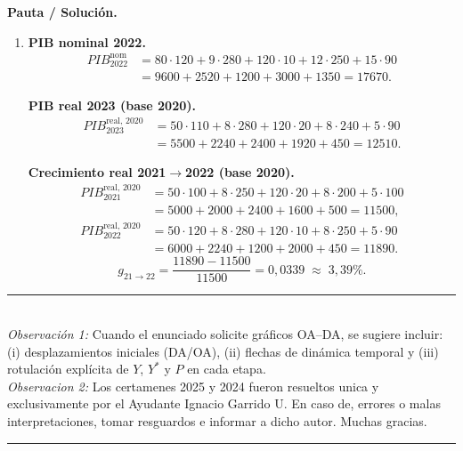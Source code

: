 \documentclass[11pt,addpoints]{article}
\begin{document}
\textbf{Pauta / Solución.}
\begin{enumerate}[label=\alph*)]
\item \textbf{PIB nominal 2022.}
\[
\begin{aligned}
PIB_{2022}^{\text{nom}} &= 80\cdot120 + 9\cdot280 + 120\cdot 10 + 12\cdot 250 + 15\cdot 90 \\
&= 9600 + 2520 + 1200 + 3000 + 1350 = \boxed{17670}.
\end{aligned}
\]

\textbf{PIB real 2023 (base 2020).}
\[
\begin{aligned}
PIB_{2023}^{\text{real},\,2020} &= 50\cdot 110 + 8\cdot 280 + 120\cdot 20 + 8\cdot 240 + 5\cdot 90 \\
&= 5500 + 2240 + 2400 + 1920 + 450 = \boxed{12510}.
\end{aligned}
\]

\textbf{Crecimiento real 2021$\to$2022 (base 2020).}
\[
\begin{aligned}
PIB_{2021}^{\text{real},\,2020} &= 50\cdot 100 + 8\cdot 250 + 120\cdot 20 + 8\cdot 200 + 5\cdot 100 \\
&= 5000 + 2000 + 2400 + 1600 + 500 = 11500, \\
PIB_{2022}^{\text{real},\,2020} &= 50\cdot 120 + 8\cdot 280 + 120\cdot 10 + 8\cdot 250 + 5\cdot 90 \\
&= 6000 + 2240 + 1200 + 2000 + 450 = 11890.
\end{aligned}
\]
\[
g_{21\to22} = \frac{11890 - 11500}{11500} = \boxed{0{,}0339 \;\approx\; 3{,}39\%}.
\]
\end{enumerate}


\begin{center}
\rule{0.9\linewidth}{0.6pt}\\
\textit{Observación 1:} Cuando el enunciado solicite gráficos OA--DA, se sugiere incluir: (i) desplazamientos iniciales (DA/OA), (ii) flechas de dinámica temporal y (iii) rotulación explícita de $Y$, $Y^*$ y $P$ en cada etapa.\\
\textit{Observacion 2:} Los certamenes 2025 y 2024 fueron resueltos unica y exclusivamente por el Ayudante Ignacio Garrido U. En caso de, errores o malas interpretaciones, tomar resguardos e informar a dicho autor. Muchas gracias.
\rule{0.9\linewidth}{0.6pt}
\end{center}



\newpage
\vspace*{0.1cm}
\end{document}
